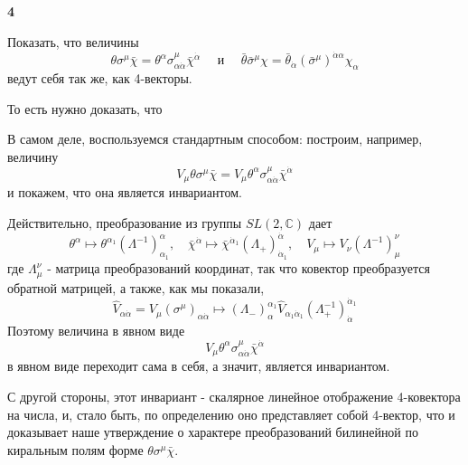 \documentclass[a4paper,12pt]{article} %
\begin{document}
\begin{task}\textbf{4}

Показать, что величины
$$
\theta \sigma^{\mu} \bar{\chi}=
\theta^{\alpha} \sigma_{\alpha \dot{\alpha}}^{\mu} \bar{\chi}^{\dot{\alpha}} 
\quad \text { и } \quad 
\bar{\theta} \bar{\sigma}^{\mu} \chi=
\bar{\theta}_{\dot{\alpha}}\left(\bar{\sigma}^{\mu}\right)^{\dot{\alpha} \alpha} \chi_{\alpha}
$$
ведут себя так же, как 4-векторы.

То есть нужно доказать, что



В самом деле, воспользуемся стандартным способом: 
построим, например, величину
$$
V_{\mu} \theta \sigma^{\mu} \bar{\chi}
=
V_{\mu} \theta^{\alpha} \sigma_{\alpha \dot{\alpha}}^{\mu} \bar{\chi}^{\dot{\alpha}}
$$
и покажем, что она является инвариантом. 


Действительно, преобразование из группы $S L(2, \mathbb{C})$ дает
$$
\theta^{\alpha} \mapsto \theta^{\alpha_{1}}\left(\Lambda^{-1}\right)_{\alpha_{1}}^{\alpha}, \quad \bar{\chi}^{\dot{\alpha}} \mapsto \bar{\chi}^{\dot{\alpha}_{1}}\left(\Lambda_{+}\right)_{\dot{\alpha}_{1}}^{\dot{\alpha}}, \quad V_{\mu} \mapsto V_{\nu}\left(\Lambda^{-1}\right)_{\mu}^{\nu}
$$
где $\Lambda_{\mu}^{\nu}$ - матрица преобразований координат, так что ковектор преобразуется обратной матрицей, а также, как мы показали,
$$
\hat{V}_{\alpha \dot{\alpha}}=V_{\mu}\left(\sigma^{\mu}\right)_{\alpha \dot{\alpha}} \mapsto\left(\Lambda_{-}\right)_{\alpha}^{\alpha_{1}} \hat{V}_{\alpha_{1} \dot{\alpha}_{1}}\left(\Lambda_{+}^{-1}\right)_{\dot{\alpha}}^{\dot{\alpha}_{1}}
$$
Поэтому величина в явном виде
$$
V_{\mu} \theta^{\alpha} \sigma_{\alpha \dot{\alpha}}^{\mu} \bar{\chi}^{\dot{\alpha}}
$$
в явном виде переходит сама в себя, а значит, является инвариантом. 




С другой стороны, этот инвариант - скалярное линейное отображение 4-ковектора на числа, и, 
стало быть, по определению оно представляет собой 4-вектор, 
что и доказывает наше утверждение о характере преобразований 
билинейной по киральным полям форме $\theta \sigma^{\mu} \bar{\chi}$. 








\end{task}
\end{document}
